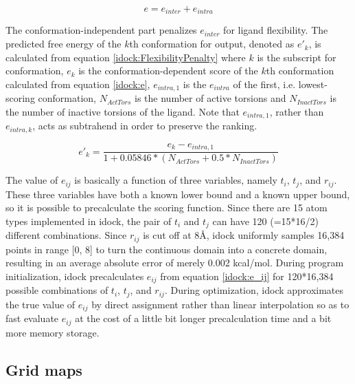 \begin{equation}
\label{idock:inter+intra}
e = e_{inter} + e_{intra}
\end{equation}

The conformation-independent part penalizes $e_{inter}$ for ligand flexibility. The predicted free energy of the $k$th conformation for output, denoted as $e'_k$, is calculated from equation \eqref{idock:FlexibilityPenalty} where $k$ is the subscript for conformation, $e_k$ is the conformation-dependent score of the $k$th conformation calculated from equation \eqref{idock:e}, $e_{intra,1}$ is the $e_{intra}$ of the first, i.e. lowest-scoring conformation, $N_{ActTors}$ is the number of active torsions and $N_{InactTors}$ is the number of inactive torsions of the ligand. Note that $e_{intra,1}$, rather than $e_{intra,k}$, acts as subtrahend in order to preserve the ranking.

\begin{equation}
\label{idock:FlexibilityPenalty}
e'_k = \frac{e_k - e_{intra,1}}{1 + 0.05846 * (N_{ActTors} + 0.5 * N_{InactTors})}
\end{equation}

The value of $e_{ij}$ is basically a function of three variables, namely $t_i$, $t_j$, and $r_{ij}$. These three variables have both a known lower bound and a known upper bound, so it is possible to precalculate the scoring function. Since there are 15 atom types implemented in idock, the pair of $t_i$ and $t_j$ can have 120 (=15*16/2) different combinations. Since $r_{ij}$ is cut off at 8\AA, idock uniformly samples 16,384 points in range [0, 8] to turn the continuous domain into a concrete domain, resulting in an average absolute error of merely 0.002 kcal/mol. During program initialization, idock precalculates $e_{ij}$ from equation \eqref{idock:e_ij} for 120*16,384 possible combinations of $t_i$, $t_j$, and $r_{ij}$. During optimization, idock approximates the true value of $e_{ij}$ by direct assignment rather than linear interpolation so as to fast evaluate $e_{ij}$ at the cost of a little bit longer precalculation time and a bit more memory storage.

\subsection{Grid maps}

